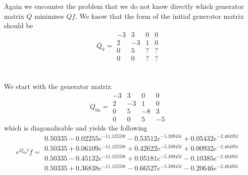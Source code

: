 \documentclass{article}
\begin{document}
Again we encounter the problem that we do not know directly which generator matrix $Q$ minimises $Qf$.
We know that the form of the initial generator matrix should be
\begin{equation*} 
 \overline{Q}_{0}= 
 \begin{array}{|rrrr|}
  -3 & 3 & 0 & 0 \\
  2 & -3 & 1 & 0 \\
  0 & 5 & ? & ? \\
  0 & 0 & ? & ? 
 \end{array}
 \end{equation*}\\\\
We start with the generator matrix 
\begin{equation*} 
 Q_{0a}= 
 \begin{array}{|rrrr|}
  -3 & 3 & 0 & 0 \\
  2 & -3 & 1 & 0 \\
  0 & 5 & -8 & 3 \\
  0 & 0 & 5 & -5 
 \end{array}
 \end{equation*}
which is diagonalisable and yields the following
\begin{equation*} 
 e^{Q_{0a}t}f= 
 \begin{array}{|r|}
  0.50335-0.02255e^{-11.12559t}- 0.53512e^{-5.38945t}+ 0.05432e^{-2.48495t}\\
  0.50335+0.06109e^{-11.12559t}+ 0.42622e^{-5.38945t}+ 0.00932e^{-2.48495t}\\
  0.50335-0.45132e^{-11.12559t}+ 0.05181e^{-5.38945t}- 0.10385e^{-2.48495t}\\
  0.50335+0.36838e^{-11.12559t}- 0.66527e^{-5.38945t}- 0.20646e^{-2.48495t}  
 \end{array}
 \end{equation*}
\end{document}
